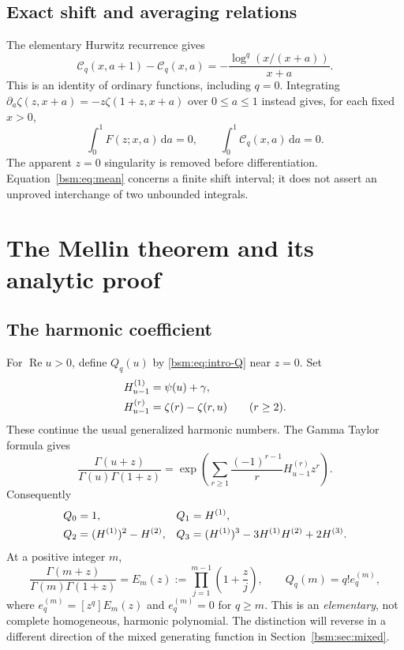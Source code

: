 \documentclass[11pt,letterpaper]{article}
\numberwithin{equation}{section}
\theoremstyle{definition}\newtheorem{definition}[theorem]{Definition}
\theoremstyle{remark}\newtheorem{remark}[theorem]{Remark}
\DeclareMathOperator{\Ree}{Re}
\newcommand{\dd}{\,\mathrm{d}}
\newcommand{\Ccal}{\mathcal C}
\newcommand{\Qcal}{Q}
\begin{document}
\subsection{Exact shift and averaging relations}
The elementary Hurwitz recurrence gives
\begin{equation}\label{bsm:eq:shift}
 \boxed{\displaystyle
 \Ccal_q(x,a+1)-\Ccal_q(x,a)
       =-\frac{\log^q(x/(x+a))}{x+a}.}
\end{equation}
This is an identity of ordinary functions, including $q=0$.
Integrating $\partial_a\zeta(z,x+a)=-z\zeta(1+z,x+a)$ over
$0\le a\le1$ instead gives, for each fixed $x>0$,
\begin{equation}\label{bsm:eq:mean}
 \int_0^1F(z;x,a)\dd a=0,
 \qquad \int_0^1\Ccal_q(x,a)\dd a=0.
\end{equation}
The apparent $z=0$ singularity is removed before differentiation.
Equation~\eqref{bsm:eq:mean} concerns a finite shift interval; it does not
assert an unproved interchange of two unbounded integrals.

\section{The Mellin theorem and its analytic proof}\label{bsm:sec:mellin}

\subsection{The harmonic coefficient}
For $\Ree u>0$, define $\Qcal_q(u)$ by \eqref{bsm:eq:intro-Q} near $z=0$.
Set
\begin{align}
 H_{u-1}^{(1)}&=\psi(u)+\gamma,\notag\\
 H_{u-1}^{(r)}&=\zeta(r)-\zeta(r,u)\qquad(r\ge2).
 \label{bsm:eq:general-harmonic}
\end{align}
These continue the usual generalized harmonic numbers. The Gamma
Taylor formula gives
\begin{equation}\label{bsm:eq:Q-log}
 \frac{\Gamma(u+z)}{\Gamma(u)\Gamma(1+z)}
 =\exp\left(\sum_{r\ge1}\frac{(-1)^{r-1}}{r}
                              H_{u-1}^{(r)}z^r\right).
\end{equation}
Consequently
\begin{align}
 \Qcal_0&=1,&\Qcal_1&=H^{(1)},\notag\\
 \Qcal_2&=(H^{(1)})^2-H^{(2)},&
 \Qcal_3&=(H^{(1)})^3-3H^{(1)}H^{(2)}+2H^{(3)}.
 \label{bsm:eq:Q-low}
\end{align}
At a positive integer $m$,
\begin{equation}\label{bsm:eq:Q-integer}
 \frac{\Gamma(m+z)}{\Gamma(m)\Gamma(1+z)}
     =E_m(z):=\prod_{j=1}^{m-1}\left(1+\frac zj\right),
 \qquad \Qcal_q(m)=q!e_q^{(m)},
\end{equation}
where $e_q^{(m)}=[z^q]E_m(z)$ and $e_q^{(m)}=0$ for $q\ge m$.
This is an \emph{elementary}, not complete homogeneous, harmonic
polynomial. The distinction will reverse in a different direction of
the mixed generating function in Section~\ref{bsm:sec:mixed}.
\end{document}
